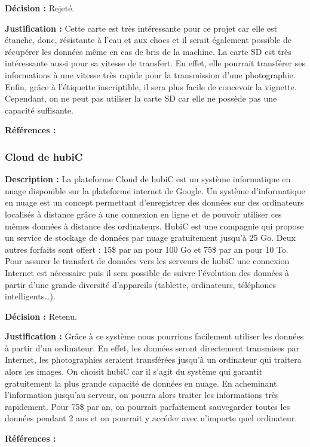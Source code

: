 \textbf{Décision :} Rejeté.

\textbf{Justification :} Cette carte est très intéressante pour ce projet car elle est étanche, donc, résistante à l’eau et aux chocs et il serait également possible de récupérer les données même en cas de bris de la machine. La carte SD est très intéressante aussi pour sa vitesse de transfert. En effet, elle pourrait transférer ses informations à une vitesse très rapide pour la transmission d’une photographie. Enfin, grâce à l’étiquette inscriptible, il sera plus facile de concevoir la vignette. Cependant, on ne peut pas utiliser la carte SD car elle ne possède pas une capacité suffisante.

\textbf{Références :} \cite{casd} \cite{amsd}

\subsubsection{Cloud de hubiC}
\textbf{Description :} La plateforme Cloud de hubiC est un système informatique en nuage disponible sur la plateforme internet de Google. Un système d’informatique en nuage est un concept permettant d’enregistrer des données sur des ordinateurs localisés à distance grâce à une connexion en ligne et de pouvoir utiliser ces mêmes données à distance des ordinateurs. HubiC est une compagnie qui propose un service de stockage de données par nuage gratuitement jusqu’à 25 Go. Deux autres forfaits sont offert : 15\$ par an pour 100 Go et 75\$ par an pour 10 To. Pour assurer le transfert de données vers les serveurs de hubiC une connexion Internet est nécessaire puis il sera possible de suivre l’évolution des données à partir d’une grande diversité d’appareils (tablette, ordinateurs, téléphones intelligents…). 

\textbf{Décision :} Retenu.

\textbf{Justification :} Grâce à ce système nous pourrions facilement utiliser les données à partir d’un ordinateur. En effet, les données seront directement transmises par Internet, les photographies seraient transférées jusqu’à un ordinateur qui traitera alors les images. On choisit hubiC car il s’agit du système qui garantit gratuitement la plus grande capacité de données en nuage. En acheminant l’information jusqu’au serveur, on pourra alors traiter les informations très rapidement. Pour 75\$ par an, on pourrait parfaitement sauvegarder toutes les données pendant 2 ans et on pourrait y accéder avec n’importe quel ordinateur.

\textbf{Références :} \cite{hubic} \cite{clgo} \cite{incl}

